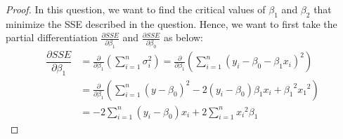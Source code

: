 \begin{answer}
\begin{proof}
    In this question, we want to find the critical values of $\beta_1$ and $\beta_2$ that minimize the SSE described in the question. Hence, we want to first take the partial differentiation $\tfrac{\partial SSE}{\partial \beta_1}$ and $\tfrac{\partial SSE}{\partial \beta_0}$ as below:
    \begin{align}
        \dfrac{\partial SSE}{\partial \beta_1} & = \tfrac{\partial}{\partial \beta_1}{\left(\sum_{i = 1}^{n}{\sigma_{i}^2}\right)} = \tfrac{\partial}{\partial \beta_1}{\left(\sum_{i = 1}^{n}{(y_i - \beta_0 - \beta_1x_i)^2}\right)}\\ 
        & = \tfrac{\partial}{\partial \beta_1}{\left(\sum_{i = 1}^{n}{(y-\beta_0)^2 - 2(y_i-\beta_0)\beta_1x_i + {\beta_1}^2{x_1}^2}\right)}\\
        & = -2\sum_{i = 1}^{n}{(y_i-\beta_0)x_i} + 2\sum_{i = 1}^{n}{x_i}^2\beta_1
    \end{align}
    

\end{proof}
\end{answer}
